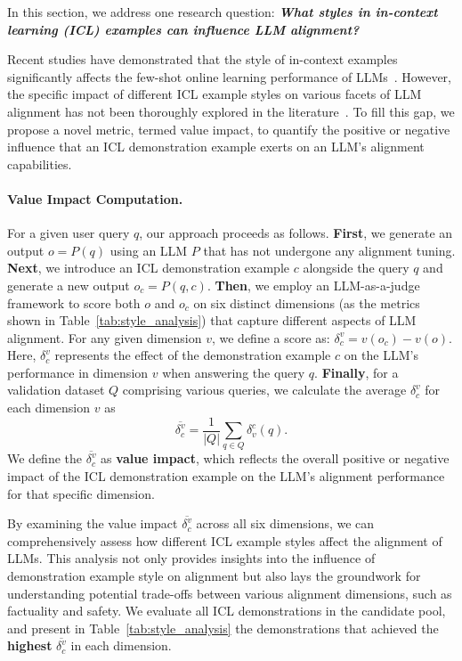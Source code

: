 %
In this section, we address one research question: \textbf{\textit{What styles in in-context learning (ICL) examples can influence LLM alignment?}}

Recent studies have demonstrated that the style of in-context examples significantly affects the few-shot online learning performance of LLMs~\citep{chen2024retrieval}. 
However, the specific impact of different ICL example styles on various facets of LLM alignment has not been thoroughly explored in the literature~\citep{milliere2023alignment,anwar2024foundational}.
To fill this gap, we propose a novel metric, termed value impact, to quantify the positive or negative influence that an ICL demonstration example exerts on an LLM’s alignment capabilities.

\paragraph{Value Impact Computation.} For a given user query 
$q$, our approach proceeds as follows.
\textbf{First}, we generate an output $o=P(q)$ 
 using an LLM $P$ that has not undergone any alignment tuning.
\textbf{Next}, we introduce an ICL demonstration example $c$ alongside the query $q$ and generate a new output $o_c = P(q,c)$.
\textbf{Then}, we employ an LLM-as-a-judge framework to score both $o$ and $o_c$ on six distinct dimensions (as the metrics shown in Table~\ref{tab:style_analysis}) that capture different aspects of LLM alignment. For any given dimension $v$, we define a score as:
$\delta ^v_c = v(o_c) - v(o)$.
Here, $\delta ^v_c$ represents the effect of the demonstration example $c$ on the LLM's performance in dimension $v$ when answering the query $q$.
\textbf{Finally}, for a validation dataset $Q$ comprising various queries, we calculate the average $\delta ^v_c$ for each dimension $v$ as \[
\overline{\delta_c^v} = \frac{1}{|Q|} \sum_{q \in Q} \delta_v^c(q).
\]
We define the $\overline{\delta_c^v}$ as \textbf{value impact}, which reflects the overall positive or negative impact of the ICL demonstration example on the LLM’s alignment performance for that specific dimension.

By examining the value impact $\overline{\delta_c^v}$ across all six dimensions, we can comprehensively assess how different ICL example styles affect the alignment of LLMs. This analysis not only provides insights into the influence of demonstration example style on alignment but also lays the groundwork for understanding potential trade-offs between various alignment dimensions, such as factuality and safety.
We evaluate all ICL demonstrations in the candidate pool, and present in Table~\ref{tab:style_analysis} the demonstrations that achieved the \textbf{highest} $\overline{\delta_c^v}$ in each dimension. 

